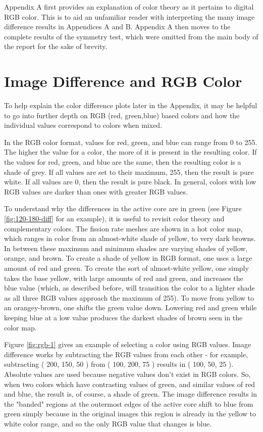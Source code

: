 
\label{app}

Appendix A first provides an explanation of color theory as it pertains to digital RGB color.  This is to aid an unfamiliar reader with interpreting the many image difference results in Appendices A and B.  Appendix A then moves to the complete results of the symmetry test, which were omitted from the main body of the report for the sake of brevity. 

\section{Image Difference and RGB Color}
To help explain the color difference plots later in the Appendix, it may be helpful to go into further depth on RGB (red, green,blue) based colors and how the individual values correspond to colors when mixed.

In the RGB color format, values for red, green, and blue can range from 0 to 255.  The higher the value for a color, the more of it is present in the resulting color.  If the values for red, green, and blue are the same, then the resulting color is a shade of grey.  If all values are set to their maximum, 255, then the result is pure white.  If all values are 0, then the result is pure black.  In general, colors with low RGB values are darker than  ones with greater RGB values.

To understand why the differences in the active core are in green (see Figure \ref{fig:120-180-diff} for an example), it is useful to revisit color theory and complementary colors.  The fission rate meshes are shown in a hot color map, which ranges in color from an almost-white shade of yellow, to very dark browns.  In between these maximum and minimum shades are varying shades of yellow, orange, and brown.  To create a shade of yellow in RGB format, one uses a large amount of red and green.  To create the sort of almost-white yellow, one simply takes the base yellow, with large amounts of red and green, and increases the blue value (which, as described before, will transition the color to a lighter shade as all three RGB values approach the maximum of 255).  To move from yellow to an orangey-brown, one shifts the green value down.  Lowering red and green while keeping blue at a low value produces the darkest shades of brown seen in the color map.



Figure \ref{fig:rgb-1} gives an example of selecting a color using RGB values.  Image difference works by subtracting the RGB values from each other - for example, subtracting ( 200, 150, 50 ) from ( 100, 200, 75 ) results in ( 100, 50, 25 ).  Absolute values are used because negative values don't exist in RGB colors.  So, when  two colors which have contrasting values of green, and similar values of red and blue, the result is, of course, a shade of green.  The image difference results in the "banded" regions at the outermost edges of the active core shift to blue from green simply because in the original images this region is already in the yellow to white color range, and so the only RGB value that changes is blue.

